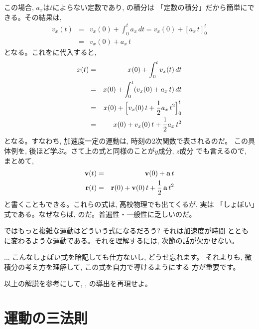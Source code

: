 この場合, $a_x$は$t$によらない定数であり, の積分は
「定数の積分」だから簡単にできる。その結果は, 
\begin{eqnarray}
v_x(t)&=&v_x(0)+\int_{0}^{t}a_x\, dt=v_x(0)+[a_x\,t]_{0}^{t}\nonumber\\
&=&v_x(0)+a_x\,t\label{eq:constacc_vx}
\end{eqnarray}
となる。これをに代入すると, 
\begin{eqnarray}
x(t)&=&x(0)+\int_{0}^{t}v_x(t)\, dt\nonumber\\
&=&x(0)+\int_{0}^{t}(v_x(0)+a_x\,t)\, dt\nonumber\\
&=&x(0)+\Bigl[v_x(0)\,t+\frac{1}{2}a_x\,t^2\Bigr]_0^t\nonumber\\
&=&x(0)+v_x(0)\,t+\frac{1}{2}a_x\,t^2\label{eq:constacc_x}
\end{eqnarray}
となる。すなわち, 加速度一定の運動は, 時刻の2次関数で表されるのだ。
この具体例を, 後ほど学ぶ。さて上の式と同様のことが$y$成分, $z$成分
でも言えるので, まとめて, 
\begin{eqnarray}
{\bf v}(t)&=&{\bf v}(0)+{\bf a}\,t\label{eq:constacc_v5}\\
{\bf r}(t)&=&{\bf r}(0)+{\bf v}(0)\,t+\frac{1}{2}\,{\bf a}\,t^2\label{eq:constacc_r5}
\end{eqnarray}
と書くこともできる。これらの式は, 高校物理でも出てくるが, 実は
「しょぼい」式である。なぜならば, のだ。普遍性・一般性に乏しいのだ。

ではもっと複雑な運動はどういう式になるだろう? それは加速度が時間
とともに変わるような運動である。それを理解するには, 次節の話が欠かせない。\mv

\begin{faq}{\small{} ... こんなしょぼい式を暗記しても仕方ないし, どうせ忘れます。
それよりも, 微積分の考え方を理解して, この式を自力で導けるようにする
方が重要です。}\end{faq}

\begin{q}\label{q:constaccel} 以上の解説を参考にして, 
, の導出を再現せよ。\end{q}
\hv


\section{運動の三法則}

